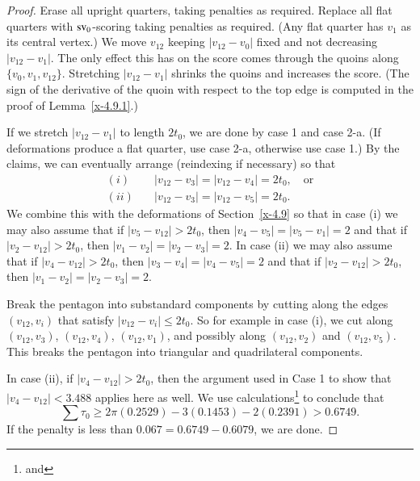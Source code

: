 \begin{proof}
Erase all upright quarters, taking penalties as required.  Replace
all flat quarters with ${\operatorname{sv}}_0$-scoring taking penalties as
required. (Any flat quarter has $v_1$ as its central vertex.) We
move $v_{12}$ keeping $|v_{12}-v_0|$ fixed and not decreasing
$|v_{12}-v_1|$.  The only effect this has on the score comes
through the quoins along $\{v_0,v_1,v_{12}\}$. Stretching
$|v_{12}-v_1|$ shrinks the quoins and increases the score. (The
sign of the derivative of the quoin with respect to the top edge
is computed in the proof of Lemma~\ref{x-4.9.1}.)

If we stretch $|v_{12}-v_1|$ to length $2t_0$, we are done by case
1 and case 2-a. (If deformations produce a flat quarter, use case
2-a, otherwise use case 1.) By the claims, we can eventually
arrange (reindexing if necessary) so that
$$
\begin{array}{lll}
(i)&\quad |v_{12}-v_3|=|v_{12}-v_4|=2t_0,\quad\text{or}\\
(ii)&\quad |v_{12}-v_3|=|v_{12}-v_5|=2t_0.
\end{array}
$$
We combine this with the deformations of Section~\ref{x-4.9} so
that in case (i) we may also assume that if $|v_5-v_{12}|>2t_0$,
then $|v_4-v_5|=|v_5-v_1|=2$ and that if $|v_2-v_{12}|>2t_0$, then
$|v_1-v_2|=|v_2-v_3|=2$. In case (ii) we may also assume that if
$|v_4-v_{12}|>2t_0$, then $|v_3-v_4|=|v_4-v_5|=2$ and that if
$|v_2-v_{12}|>2t_0$, then $|v_1-v_2|=|v_2-v_3|=2$.

Break the pentagon into substandard components by cutting along the edges
$(v_{12},v_i)$ that satisfy $|v_{12}-v_i|\le2t_0$. So for example
in case (i), we cut along $(v_{12},v_3)$, $(v_{12},v_4)$,
$(v_{12},v_1)$, and possibly along $(v_{12},v_2)$ and
$(v_{12},v_5)$.  This breaks the pentagon into triangular and
quadrilateral components.

In case (ii), if $|v_4-v_{12}|>2t_0$, then the argument used in
Case 1 to show that $|v_4-v_{12}|<3.488$ applies here as well.
We use
calculations\footnote{ and } to
conclude that
    $$\sum\tau_0 \ge 2\pi (0.2529) -3 (0.1453) -2 (0.2391) > 0.6749.$$
If the penalty is less than $0.067=0.6749-0.6079$, we are done.


\end{proof}
